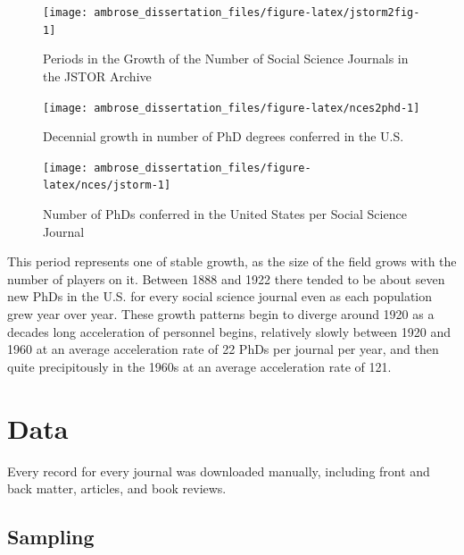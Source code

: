 \documentclass[]{book}
\begin{document}
\begin{figure}

{\centering \texttt{[image: ambrose\_dissertation\_files/figure-latex/jstorm2fig-1]} 

}

\caption{Periods in the Growth of the Number of Social Science Journals in the JSTOR Archive}\label{fig:jstorm2fig}
\end{figure}

\begin{figure}

{\centering \texttt{[image: ambrose\_dissertation\_files/figure-latex/nces2phd-1]} 

}

\caption{Decennial growth in number of PhD degrees conferred in the U.S.}\label{fig:nces2phd}
\end{figure}

\begin{figure}

{\centering \texttt{[image: ambrose\_dissertation\_files/figure-latex/nces/jstorm-1]} 

}

\caption{Number of PhDs conferred in the United States per Social Science Journal}\label{fig:nces/jstorm}
\end{figure}

This period represents one of stable growth, as the size of the field
grows with the number of players on it. Between 1888 and 1922 there
tended to be about seven new PhDs in the U.S. for every social science
journal even as each population grew year over year. These growth
patterns begin to diverge around 1920 as a decades long acceleration of
personnel begins, relatively slowly between 1920 and 1960 at an average
acceleration rate of 22 PhDs per journal per year, and then quite
precipitously in the 1960s at an average acceleration rate of 121.

\chapter{Data}\label{kd-dd}

Every record for every journal was downloaded manually, including front
and back matter, articles, and book reviews.

\section{Sampling}\label{kd-dp1}
\end{document}
